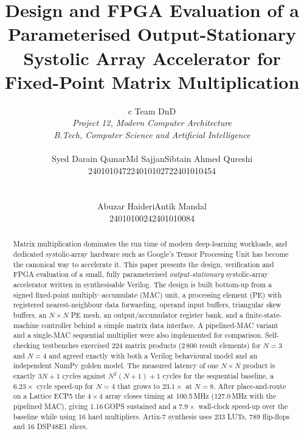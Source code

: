\documentclass[conference]{IEEEtran}
\begin{document}
\title{Design and FPGA Evaluation of a Parameterised Output-Stationary Systolic Array Accelerator for Fixed-Point Matrix Multiplication}

\author{%
\begin{tabular}{c}
{\Large Team DnD}\\[3pt]
{\small\itshape Project 12, Modern Computer Architecture}\\
{\small\itshape B.Tech, Computer Science and Artificial Intelligence}\\[10pt]
\begin{tabular}{c@{\hspace{2.4em}}c@{\hspace{2.4em}}c}
Syed Darain Qamar & Md Sajjan & Sibtain Ahmed Qureshi\\
{\small 2401010472} & {\small 2401010272} & {\small 2401010454}
\end{tabular}\\[8pt]
\begin{tabular}{c@{\hspace{2.4em}}c}
Abuzar Haideri & Antik Mandal\\
{\small 2401010024} & {\small 2401010084}
\end{tabular}
\end{tabular}}

\maketitle

\begin{abstract}
Matrix multiplication dominates the run time of modern deep-learning
workloads, and dedicated systolic-array hardware such as Google's Tensor
Processing Unit has become the canonical way to accelerate it. This paper
presents the design, verification and FPGA evaluation of a small, fully
parameterised \emph{output-stationary} systolic-array accelerator written in
synthesisable Verilog. The design is built bottom-up from a signed fixed-point
multiply--accumulate (MAC) unit, a processing element (PE) with registered
nearest-neighbour data forwarding, operand input buffers, triangular skew
buffers, an $N\times N$ PE mesh, an output/accumulator register bank, and a
finite-state-machine controller behind a simple matrix data interface. A
pipelined-MAC variant and a single-MAC sequential multiplier were also
implemented for comparison. Self-checking testbenches exercised 224 matrix
products (2\,800 result elements) for $N=3$ and $N=4$ and agreed exactly with
both a Verilog behavioural model and an independent NumPy golden model. The
measured latency of one $N\times N$ product is exactly $3N+1$ cycles against
$N^2(N+1)+1$ cycles for the sequential baseline, a $6.23\times$ cycle speed-up
for $N=4$ that grows to $23.1\times$ at $N=8$. After place-and-route on a
Lattice ECP5 the $4\times4$ array closes timing at 100.5\,MHz (127.0\,MHz with
the pipelined MAC), giving 1.16\,GOPS sustained and a $7.9\times$ wall-clock
speed-up over the baseline while using 16 hard multipliers. Artix-7 synthesis
uses 233 LUTs, 789 flip-flops and 16 DSP48E1 slices.
\end{abstract}
\end{document}
